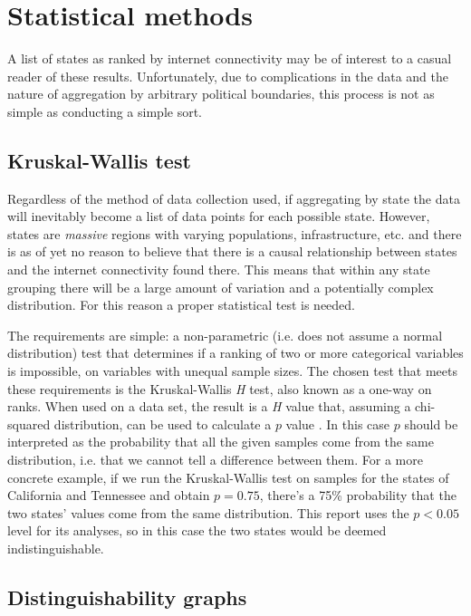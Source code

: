 \section{Statistical methods}\label{sec:stats_methods}
A list of states as ranked by internet connectivity may be of interest to a casual reader of these results. Unfortunately, due to complications in the data and the nature of aggregation by arbitrary political boundaries, this process is not as simple as conducting a simple sort.

\subsection{Kruskal-Wallis test}

Regardless of the method of data collection used, if aggregating by state the data will inevitably become a list of data points for each possible state. However, states are \textit{massive} regions with varying populations, infrastructure, etc. and there is as of yet no reason to believe that there is a causal relationship between states and the internet connectivity found there. This means that within any state grouping there will be a large amount of variation and a potentially complex distribution. For this reason a proper statistical test is needed.

The requirements are simple: a non-parametric (i.e. does not assume a normal distribution) test that determines if a ranking of two or more categorical variables is impossible, on variables with unequal sample sizes. The chosen test that meets these requirements is the Kruskal-Wallis \textit{H} test, also known as a one-way \anova on ranks. When used on a data set, the result is a \textit{H} value that, assuming a chi-squared distribution, can be used to calculate a $p$ value \cite{kruskal-wallis}. In this case $p$ should be interpreted as the probability that all the given samples come from the same distribution, i.e. that we cannot tell a difference between them. For a more concrete example, if we run the Kruskal-Wallis test on samples for the states of California and Tennessee and obtain $p=0.75$, there's a 75\% probability that the two states' values come from the same distribution. This report uses the $p<0.05$ level for its analyses, so in this case the two states would be deemed indistinguishable.

\subsection{Distinguishability graphs}

